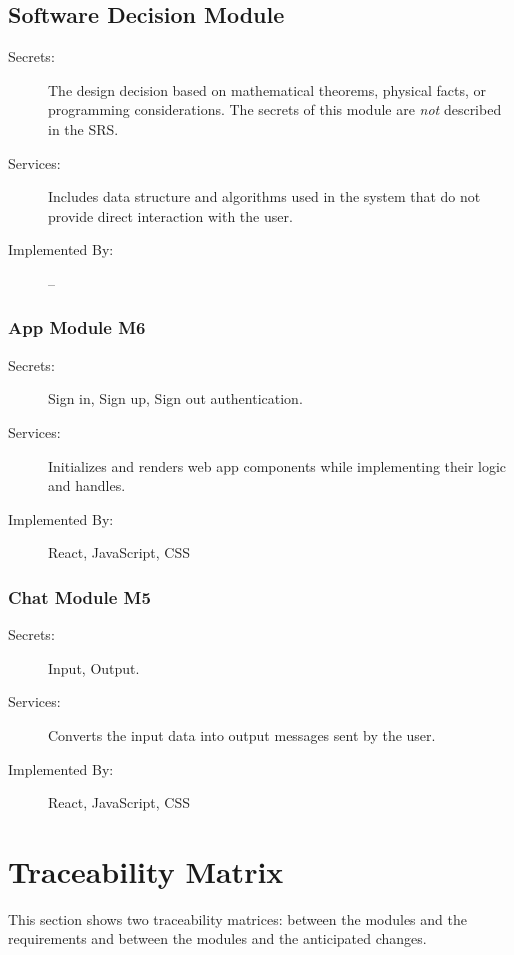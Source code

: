\documentclass[12pt, titlepage]{article}
\begin{document}
\subsection{Software Decision Module}

\begin{description}
\item[Secrets:] The design decision based on mathematical theorems, physical
  facts, or programming considerations. The secrets of this module are
  \emph{not} described in the SRS.
\item[Services:] Includes data structure and algorithms used in the system that
  do not provide direct interaction with the user. 
\item[Implemented By:] --
\end{description}

\subsubsection{App Module M6}
\begin{description}
\item[Secrets:]Sign in, Sign up, Sign out authentication.
\item[Services:]Initializes and renders web app components while implementing their logic and handles.
\item[Implemented By:] React, JavaScript, CSS
\end{description}

\subsubsection{Chat Module M5}
\begin{description}
\item[Secrets:]Input, Output.
\item[Services:]Converts the input data into output messages sent by the user.
\item[Implemented By:] React, JavaScript, CSS
\end{description}

\section{Traceability Matrix} \label{SecTM}

This section shows two traceability matrices: between the modules and the
requirements and between the modules and the anticipated changes.
\end{document}
